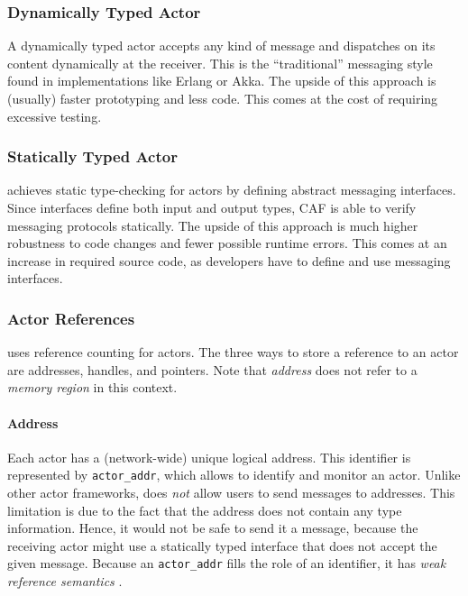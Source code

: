 \subsubsection{Dynamically Typed Actor}

A dynamically typed actor accepts any kind of message and dispatches on its
content dynamically at the receiver. This is the ``traditional'' messaging
style found in implementations like Erlang or Akka. The upside of this approach
is (usually) faster prototyping and less code. This comes at the cost of
requiring excessive testing.

\subsubsection{Statically Typed Actor}

\lib achieves static type-checking for actors by defining abstract messaging
interfaces. Since interfaces define both input and output types, CAF is able to
verify messaging protocols statically. The upside of this approach is much
higher robustness to code changes and fewer possible runtime errors. This comes
at an increase in required source code, as developers have to define and use
messaging interfaces.

\subsubsection{Actor References}
\label{actor-reference}

\lib uses reference counting for actors. The three ways to store a reference to
an actor are addresses, handles, and pointers. Note that \emph{address} does
not refer to a \emph{memory region} in this context.

\paragraph{Address}
\label{actor-address}

Each actor has a (network-wide) unique logical address. This identifier is
represented by \lstinline^actor_addr^, which allows to identify and monitor an
actor. Unlike other actor frameworks, \lib does \emph{not} allow users to send
messages to addresses. This limitation is due to the fact that the address does
not contain any type information. Hence, it would not be safe to send it a
message, because the receiving actor might use a statically typed interface
that does not accept the given message. Because an \lstinline^actor_addr^ fills
the role of an identifier, it has \emph{weak reference semantics}
.


